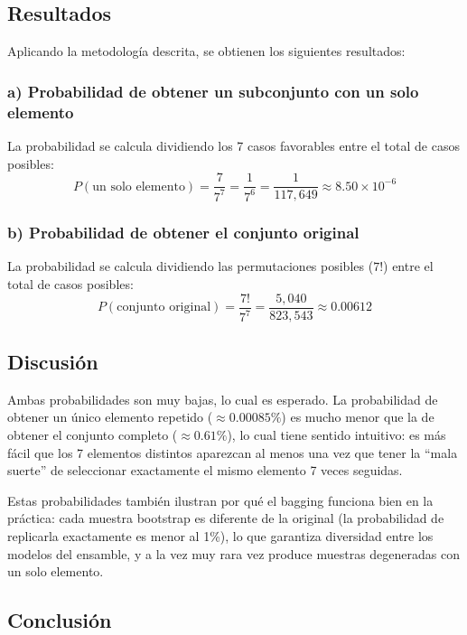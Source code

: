 \documentclass{article}
\begin{document}
\subsection{Resultados}

Aplicando la metodología descrita, se obtienen los siguientes resultados:

\subsubsection{a) Probabilidad de obtener un subconjunto con un solo elemento}

La probabilidad se calcula dividiendo los 7 casos favorables entre el total de casos posibles:
\[
    P(\text{un solo elemento}) = \frac{7}{7^7} = \frac{1}{7^6} = \frac{1}{117{,}649} \approx 8.50 \times 10^{-6}
\]

\subsubsection{b) Probabilidad de obtener el conjunto original}

La probabilidad se calcula dividiendo las permutaciones posibles ($7!$) entre el total de casos posibles:
\[
    P(\text{conjunto original}) = \frac{7!}{7^7} = \frac{5{,}040}{823{,}543} \approx 0.00612
\]

\subsection{Discusión}

Ambas probabilidades son muy bajas, lo cual es esperado. La probabilidad de obtener un único elemento repetido ($\approx 0.00085\%$) es mucho menor que la de obtener el conjunto completo ($\approx 0.61\%$), lo cual tiene sentido intuitivo: es más fácil que los 7 elementos distintos aparezcan al menos una vez que tener la ``mala suerte'' de seleccionar exactamente el mismo elemento 7 veces seguidas.

Estas probabilidades también ilustran por qué el bagging funciona bien en la práctica: cada muestra bootstrap es diferente de la original (la probabilidad de replicarla exactamente es menor al 1\%), lo que garantiza diversidad entre los modelos del ensamble, y a la vez muy rara vez produce muestras degeneradas con un solo elemento.

\subsection{Conclusión}
\end{document}
